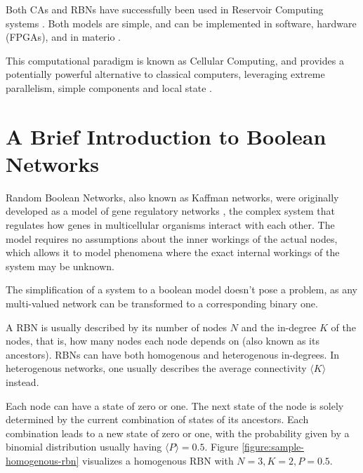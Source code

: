 Both CAs and RBNs have successfully been used in Reservoir Computing systems \cite{yilmaz2014reservoir} \cite{rbn-reservoir}.
Both models are simple, and can be implemented in software,
hardware (FPGAs), and in materio \cite{miller2002evolution} \cite{farstad2015evolving}.

This computational paradigm is known as Cellular Computing,
and provides a potentially powerful alternative to classical computers,
leveraging extreme parallelism, simple components and local state \cite{sipper1999emergence}.

\section{A Brief Introduction to Boolean Networks}
\label{section:rbns}

Random Boolean Networks, also known as Kaffman networks,
were originally developed as a model of gene regulatory networks \cite{kauffman1969metabolic},
the complex system that regulates how genes in multicellular organisms interact with each other.
The model requires no assumptions about the inner workings of the actual nodes,
which allows it to model phenomena where the exact internal workings of the system may be unknown.

The simplification of a system to a boolean model doesn't pose a problem,
as any multi-valued network can be transformed to a corresponding binary one.

A RBN is usually described by its number of nodes $N$ and the in-degree $K$ of the nodes,
that is, how many nodes each node depends on (also known as its ancestors).
RBNs can have both homogenous and heterogenous in-degrees.
In heterogenous networks, one usually describes the average connectivity $\langle K \rangle$ instead.

Each node can have a state of zero or one.
The next state of the node is solely determined by the current combination of states of its ancestors.
Each combination leads to a new state of zero or one,
with the probability given by a binomial distribution usually having $\langle P \rangle = 0.5$.
Figure \ref{figure:sample-homogenous-rbn} visualizes a homogenous RBN with $N=3, K=2, P=0.5$.

